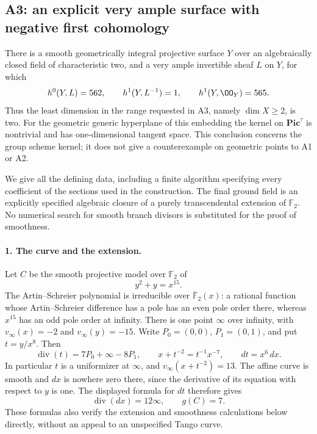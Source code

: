 \subsection{A3: an explicit very ample surface with negative first cohomology}

\begin{theorem}[A3; Proved]\label{a:very-ample-example}
There is a smooth geometrically integral projective surface $Y$ over an
algebraically closed field of characteristic two, and a very ample
invertible sheaf $L$ on $Y$, for which
\[
 h^0(Y,L)=562,\qquad h^1(Y,L^{-1})=1,\qquad h^1(Y,\OO_Y)=565.
\]
Thus the least dimension in the range requested in A3, namely
$\dim X\geq2$, is two. For the geometric generic hyperplane of this
embedding the kernel on $\mathbf{Pic}^{\tau}$ is nontrivial and has
one-dimensional tangent space. This conclusion concerns the group
scheme kernel; it does not give a counterexample on geometric points
to A1 or A2.
\end{theorem}

We give all the defining data, including a finite algorithm specifying
every coefficient of the sections used in the construction. The final
ground field is an explicitly specified algebraic closure of a purely
transcendental extension of $\mathbb F_2$. No numerical search for smooth
branch divisors is substituted for the proof of smoothness.

\paragraph{1. The curve and the extension.}
Let $C$ be the smooth projective model over $\mathbb F_2$ of
\[
 y^2+y=x^{15}.
\]
The Artin--Schreier polynomial is irreducible over
$\overline{\mathbb F}_2(x)$: a rational function whose Artin--Schreier
difference has a pole has an even pole order there, whereas $x^{15}$
has an odd pole order at infinity. There is one point $\infty$ over
infinity, with $v_\infty(x)=-2$ and $v_\infty(y)=-15$.
Write $P_0=(0,0)$, $P_1=(0,1)$, and put $t=y/x^8$. Then
\[
 \operatorname{div}(t)=7P_0+\infty-8P_1,\qquad
 x+t^{-2}=t^{-1}x^{-7},\qquad dt=x^6\,dx.
\]
In particular $t$ is a uniformizer at $\infty$, and
$v_\infty(x+t^{-2})=13$. The affine curve is smooth and $dx$ is
nowhere zero there, since the derivative of its equation with respect
to $y$ is one. The displayed formula for $dt$ therefore gives
\[
 \operatorname{div}(dx)=12\infty,\qquad g(C)=7.
\]
These formulas also verify the extension and smoothness calculations
below directly, without an appeal to an unspecified Tango curve.

